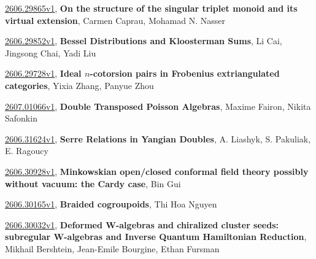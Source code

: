 \documentclass[9pt, a4paper]{article}
\theoremstyle{plain}
\theoremstyle{definition}
\theoremstyle{remark}
\newcommand{\arxiv}[3]{\href{https://arxiv.org/abs/#1}{#1}, \textbf{\textcolor{arxivblue}{#2}}, #3}
\begin{document}
\arxiv{2606.29865v1}{On the structure of the singular triplet monoid and its virtual extension}{Carmen Caprau, Mohamad N. Nasser}

\arxiv{2606.29852v1}{Bessel Distributions and Kloosterman Sums}{Li Cai, Jingsong Chai, Yadi Liu}

\arxiv{2606.29728v1}{Ideal $n$-cotorsion pairs in Frobenius extriangulated categories}{Yixia Zhang, Panyue Zhou}

\arxiv{2607.01066v1}{Double Transposed Poisson Algebras}{Maxime Fairon, Nikita Safonkin}

\arxiv{2606.31624v1}{Serre Relations in Yangian Doubles}{A. Liashyk, S. Pakuliak, E. Ragoucy}

\arxiv{2606.30928v1}{Minkowskian open/closed conformal field theory possibly without vacuum: the Cardy case}{Bin Gui}

\arxiv{2606.30165v1}{Braided cogroupoids}{Thi Hoa Nguyen}

\arxiv{2606.30032v1}{Deformed W-algebras and chiralized cluster seeds: subregular W-algebras and Inverse Quantum Hamiltonian Reduction}{Mikhail Bershtein, Jean-Emile Bourgine, Ethan Fursman}

\end{document}
